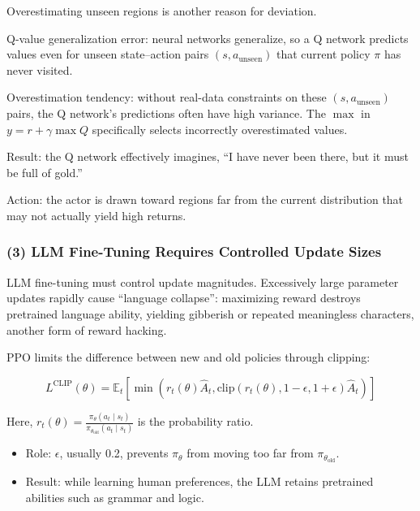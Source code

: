 Overestimating unseen regions is another reason for deviation.

Q-value generalization error: neural networks generalize, so a Q network predicts values even for unseen state--action pairs \((s,a_{\mathrm{unseen}})\) that current policy \(\pi\) has never visited.

Overestimation tendency: without real-data constraints on these \((s,a_{\mathrm{unseen}})\) pairs, the Q network's predictions often have high variance. The \(\max\) in \(y=r+\gamma\max Q\) specifically selects incorrectly overestimated values.

Result: the Q network effectively imagines, ``I have never been there, but it must be full of gold.''

Action: the actor is drawn toward regions far from the current distribution that may not actually yield high returns.

\hypertarget{llm-fine-tuning-requires-controlled-update-sizes}{%
\subsubsection{(3) LLM Fine-Tuning Requires Controlled Update Sizes}\label{llm-fine-tuning-requires-controlled-update-sizes}}

LLM fine-tuning must control update magnitudes. Excessively large parameter updates rapidly cause ``language collapse'': maximizing reward destroys pretrained language ability, yielding gibberish or repeated meaningless characters, another form of reward hacking.

PPO limits the difference between new and old policies through clipping:

\[
L^{\mathrm{CLIP}}(\theta)
=
\mathbb{E}_t
\left[
\min
\left(
r_t(\theta)\hat{A}_t,
\mathrm{clip}(r_t(\theta),1-\epsilon,1+\epsilon)\hat{A}_t
\right)
\right]
\]

Here, \(r_t(\theta)=\frac{\pi_\theta(a_t\mid s_t)}{\pi_{\theta_{\mathrm{old}}}(a_t\mid s_t)}\) is the probability ratio.

\begin{itemize}
\tightlist
\item
  Role: \(\epsilon\), usually 0.2, prevents \(\pi_\theta\) from moving too far from \(\pi_{\theta_{\mathrm{old}}}\).
\item
  Result: while learning human preferences, the LLM retains pretrained abilities such as grammar and logic.
\end{itemize}

